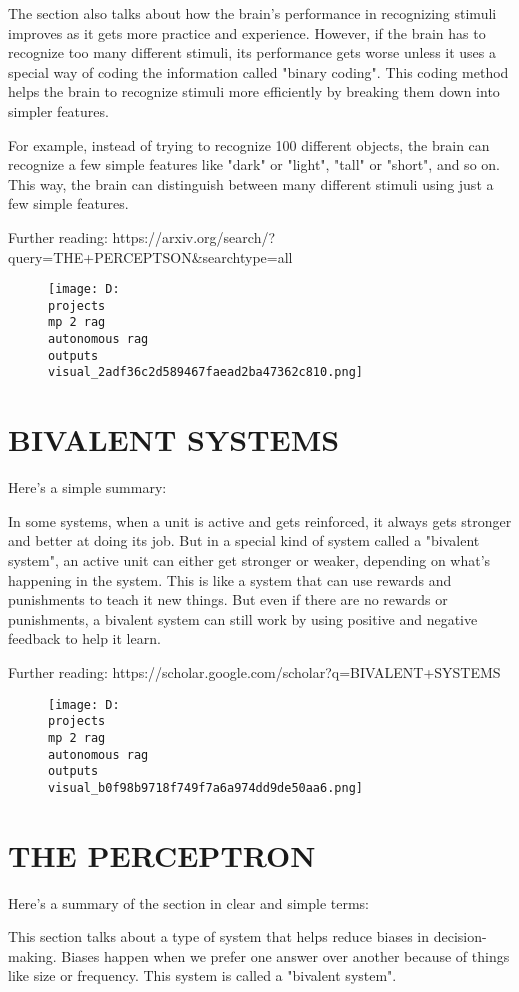 \documentclass[12pt,a4paper]{article}
\begin{document}
The section also talks about how the brain's performance in recognizing stimuli improves as it gets more practice and experience. However, if the brain has to recognize too many different stimuli, its performance gets worse unless it uses a special way of coding the information called "binary coding". This coding method helps the brain to recognize stimuli more efficiently by breaking them down into simpler features.

For example, instead of trying to recognize 100 different objects, the brain can recognize a few simple features like "dark" or "light", "tall" or "short", and so on. This way, the brain can distinguish between many different stimuli using just a few simple features.

Further reading: https://arxiv.org/search/?query=THE+PERCEPTSON&searchtype=all
\begin{figure}[h]
\centering
\texttt{[image: D:\\projects\\mp 2 rag\\autonomous rag\\outputs\\visual\_2adf36c2d589467faead2ba47362c810.png]}
\end{figure}
\section{BIVALENT SYSTEMS}
Here's a simple summary:

In some systems, when a unit is active and gets reinforced, it always gets stronger and better at doing its job. But in a special kind of system called a "bivalent system", an active unit can either get stronger or weaker, depending on what's happening in the system. This is like a system that can use rewards and punishments to teach it new things. But even if there are no rewards or punishments, a bivalent system can still work by using positive and negative feedback to help it learn.

Further reading: https://scholar.google.com/scholar?q=BIVALENT+SYSTEMS
\begin{figure}[h]
\centering
\texttt{[image: D:\\projects\\mp 2 rag\\autonomous rag\\outputs\\visual\_b0f98b9718f749f7a6a974dd9de50aa6.png]}
\end{figure}
\section{THE PERCEPTRON}
Here's a summary of the section in clear and simple terms:

This section talks about a type of system that helps reduce biases in decision-making. Biases happen when we prefer one answer over another because of things like size or frequency. This system is called a "bivalent system".
\end{document}
